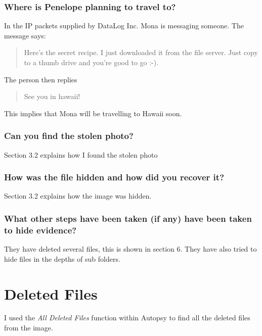 \documentclass[12pt]{article}
\begin{document}
					\subsubsection{Where is Penelope planning to travel to?}
						In the IP packets supplied by DataLog Inc. Mona is messaging someone. The message says:
						\begin{quotation}
							\noindent Here's the secret recipe. I just downloaded it from the file server. Just copy to a thumb drive and you're good to go :-). 
						\end{quotation}

						\noindent The person then replies

						\begin{quotation}
							\noindent See you in hawaii!
						\end{quotation}

						\noindent This implies that Mona will be travelling to Hawaii soon.
					\subsubsection{Can you find the stolen photo?}
						Section 3.2 explains how I found the stolen photo
					\subsubsection{How was the file hidden and how did you recover it?}
						Section 3.2 explains how the image was hidden.	
					\subsubsection{What other steps have been taken (if any) have been taken to hide evidence?}
						They have deleted several files, this is shown in section 6. They have also tried to hide files in the depths of sub folders. 	
			\section{Deleted Files}

				I used the \textit{All Deleted Files} function within Autopsy to find all the deleted files from the image.
\end{document}
